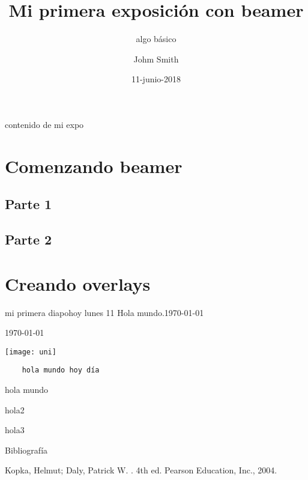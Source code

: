 \documentclass[utf8,spanish,
xcolor={x11names, table},14pt,handout]{beamer} %
\title{Mi primera exposición con beamer}
\subtitle{algo básico}
\author{Johm Smith}
\institute[UNI]{Universidad Nacional de Ingeniería}%
\date{11-junio-2018}
\begin{document}
\maketitle
\begin{frame}{contenido de mi expo}\transblindshorizontal
	\tableofcontents%
\end{frame}



\section{Comenzando beamer}
\subsection{Parte 1}
\subsection{Parte 2}

\section{Creando overlays}

\begin{frame}{mi primera diapo}{hoy lunes 11}\transblindsvertical
Hola mundo.\today
\end{frame}

\begin{frame}[t]\transboxin
\today%
\end{frame}

\begin{frame}[plain]
	\hspace*{-1cm}\texttt{[image: uni]}
\end{frame}

\begin{frame}[fragile]\transboxout
	\begin{verbatim}
	hola mundo hoy día
	\end{verbatim}
\end{frame}

\begin{frame}
	hola mundo \pause
	
	hola2 \pause
	
	hola3
\end{frame}

\begin{frame}{Bibliografía}
\begin{thebibliography}{9}%
Kopka, Helmut; Daly, Patrick W.
.
4th ed.
\newblock Pearson Education,
Inc., 2004.
\end{thebibliography}
\end{frame}
\end{document}
